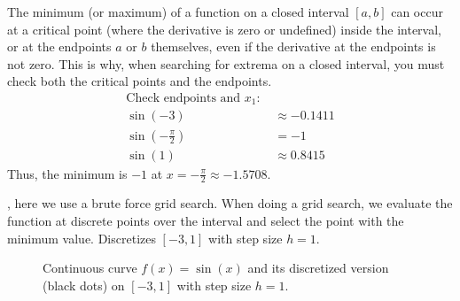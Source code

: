 \vspace{1.5em}
The minimum (or maximum) of a function on a closed interval $[a, b]$ can occur at a critical point 
(where the derivative is zero or undefined) inside the interval, 
or at the endpoints $a$ or $b$ themselves, even if the derivative at the endpoints is not zero. 
This is why, when searching for extrema on a closed interval, you must check both the critical points and the endpoints.\\


\begin{align*}
    \text{Check endpoints and $x_1$: } \\
    \sin(-3) &\approx -0.1411 \\
    \sin(-\frac{\pi}{2}) &= -1 \\
    \sin(1) &\approx 0.8415
\end{align*}
Thus, the minimum is $-1$ at $x = -\frac{\pi}{2} \approx -1.5708$.



\vspace{1em}
, here we use a brute force grid search. When doing a grid search, we evaluate the function 
at discrete points over the interval and select the point with the minimum value. Discretizes $[-3,1]$ with step size $h=1$.

\begin{figure}[h]
    \centering
    \caption{Continuous curve $f(x) = \sin(x)$ and its discretized version (black dots) on $[-3,1]$ with step size $h=1$.}
    \label{fig:discretization}
\end{figure}


